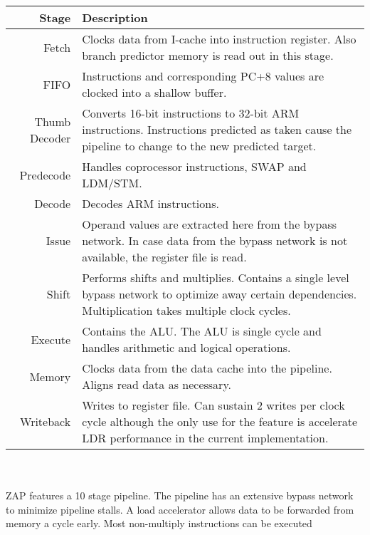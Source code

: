 \documentclass[10pt]{article}
\begin{document}
\begin{tabularx} {\linewidth}{|r|X|}
\hline

Stage & 
Description \\ \hline 

Fetch & 
Clocks data from I-cache into instruction register. Also branch predictor memory 
is read out in this stage. \\ \hline 

FIFO &
Instructions and corresponding PC+8 values are clocked into a shallow buffer.
 \\ \hline

Thumb Decoder &
Converts 16-bit instructions to 32-bit ARM instructions. Instructions predicted 
as taken cause the pipeline to change to the new predicted target. \\ \hline

Predecode &
Handles coprocessor instructions, SWAP and LDM/STM. \\ \hline

Decode &
Decodes ARM instructions. \\ \hline

Issue &
Operand values are extracted here from the bypass network. In case data from 
the bypass network is not available, the register file is read. \\ \hline

Shift &
Performs shifts and multiplies. Contains a single level bypass network to 
optimize away certain dependencies. Multiplication takes multiple clock cycles. \\ \hline

Execute &
Contains the ALU. The ALU is single cycle and handles arithmetic and logical 
operations. \\ \hline

Memory &
Clocks data from the data cache into the pipeline. Aligns read data as 
necessary. \\ \hline

Writeback &
Writes to register file. Can sustain 2 writes per clock cycle although the 
only use for the feature is accelerate LDR performance in the current 
implementation. \\ \hline
\end{tabularx}
\\
\\
ZAP features a 10 stage pipeline. The pipeline has an extensive bypass network 
to minimize pipeline stalls. A load accelerator allows data to be forwarded 
from memory a cycle early. Most non-multiply instructions can be executed 
\end{document}
